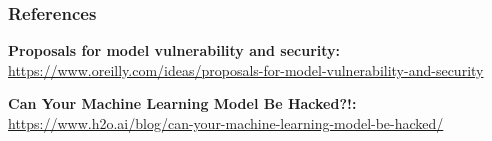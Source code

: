 \documentclass[11pt,
               aspectratio=169,
               hyperref={colorlinks}
               ]{beamer}
\begin{document}

	\begin{frame}[t, allowframebreaks]
	
		\frametitle{References}	
		
			\textbf{Proposals for model vulnerability and security:}\\
			\small{\url{https://www.oreilly.com/ideas/proposals-for-model-vulnerability-and-security}}
			
			\vspace{10pt}
			
			\textbf{Can Your Machine Learning Model Be Hacked?!:}\\
			\small{\url{https://www.h2o.ai/blog/can-your-machine-learning-model-be-hacked/}}
			
		
		\framebreak		
		
		\printbibliography
		
	\end{frame}
\end{document}

